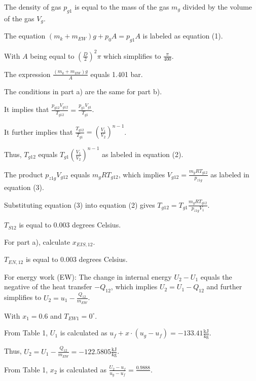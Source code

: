 The density of gas \( p_{g1} \) is equal to the mass of the gas \( m_g \) divided by the volume of the gas \( V_g \).

The equation \( (m_k + m_{EW})g + p_0 A = p_{g1} A \) is labeled as equation (1).

With \( A \) being equal to \( \left(\frac{D}{2}\right)^2 \pi \) which simplifies to \( \frac{\pi}{400} \).

The expression \( \frac{(m_k + m_{EW})g}{A} \) equals 1.401 bar.

The conditions in part a) are the same for part b).

It implies that \( \frac{p_{g12} V_{g12}}{T_{g12}} = \frac{p_{g1} V_{g1}}{T_{g1}} \).

It further implies that \( \frac{T_{g12}}{T_{g1}} = \left(\frac{V_1}{V_2}\right)^{n-1} \).

Thus, \( T_{g12} \) equals \( T_{g1} \left(\frac{V_1}{V_2}\right)^{n-1} \) as labeled in equation (2).

The product \( p_{z1g} V_{g12} \) equals \( m_g R T_{g12} \), which implies \( V_{g12} = \frac{m_g R T_{g12}}{p_{z1g}} \) as labeled in equation (3).

Substituting equation (3) into equation (2) gives \( T_{g12} = T_{g1} \frac{m_g R T_{g12}}{p_{z1g} V_1} \).

\( T_{S12} \) is equal to 0.003 degrees Celsius.

For part a), calculate \( x_{EIS,12} \).

\( T_{EN,12} \) is equal to 0.003 degrees Celsius.

For energy work (EW):
The change in internal energy \( U_2 - U_1 \) equals the negative of the heat transfer \( -Q_{12} \), which implies \( U_2 = U_1 - Q_{12} \) and further simplifies to \( U_2 = u_1 - \frac{Q_{12}}{m_{EW}} \).

With \( x_1 = 0.6 \) and \( T_{EW1} = 0^\circ \).

From Table 1, \( U_1 \) is calculated as \( u_f + x \cdot (u_g - u_f) = -133.41 \frac{\text{kJ}}{\text{kg}} \).

Thus, \( U_2 = U_1 - \frac{Q_{12}}{m_{EW}} = -122.5805 \frac{\text{kJ}}{\text{kg}} \).

From Table 1, \( x_2 \) is calculated as \( \frac{U_2 - u_f}{u_g - u_f} = \frac{0.9888}{} \).